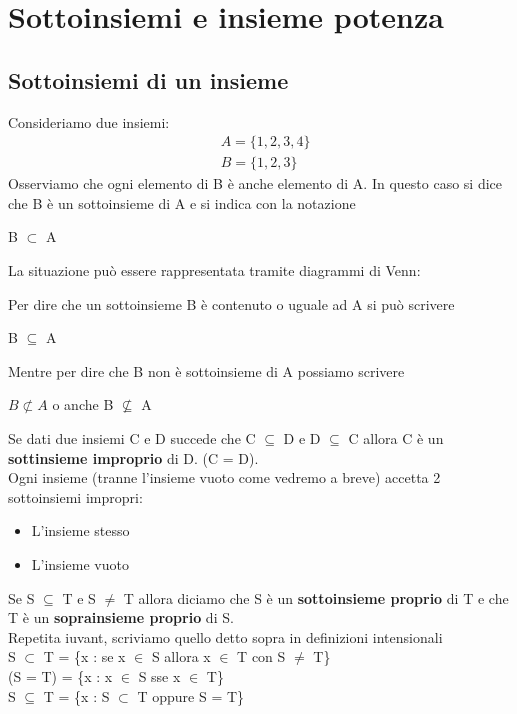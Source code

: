\section{Sottoinsiemi e insieme potenza}

\subsection{Sottoinsiemi di un insieme}
Consideriamo due insiemi:
\begin{align*}
    &A = \{1, 2, 3, 4\} \\
    &B = \{1, 2, 3\}
\end{align*}
Osserviamo che ogni elemento di B è anche elemento di A. In questo caso si dice che B è un sottoinsieme di A e si indica con la notazione
\begin{center}
    B $\subset$ A
\end{center}
La situazione può essere rappresentata tramite diagrammi di Venn:
\begin{center}
\end{center}
Per dire che un sottoinsieme B è contenuto o uguale ad A si può scrivere
\begin{center}
    B $\subseteq$ A
\end{center}
Mentre per dire che B non è sottoinsieme di A possiamo scrivere
\begin{center}
    $B \not \subset A$ o anche B $\not \subseteq$ A
\end{center}
Se dati due insiemi C e D succede che C $\subseteq$ D e D $\subseteq$ C
allora C è un \textbf{sottinsieme improprio} di D. (C = D).\\
Ogni insieme (tranne l'insieme vuoto come vedremo a breve) accetta 2 sottoinsiemi impropri:
\begin{itemize}
    \item L'insieme stesso
    \item L'insieme vuoto
\end{itemize}
Se S $\subseteq$ T e S $\neq$ T allora diciamo che S è un \textbf{sottoinsieme proprio} di T
e che T è un \textbf{soprainsieme proprio} di S. \\
Repetita iuvant, scriviamo quello detto sopra in definizioni intensionali \\
S $\subset$ T = \{x : se x $\in$ S allora x $\in$ T con S $\neq$ T\} \\
(S = T) = \{x : x $\in$ S sse x $\in$ T\} \\
S $\subseteq$ T = \{x : S $\subset$ T oppure S = T\} \\

